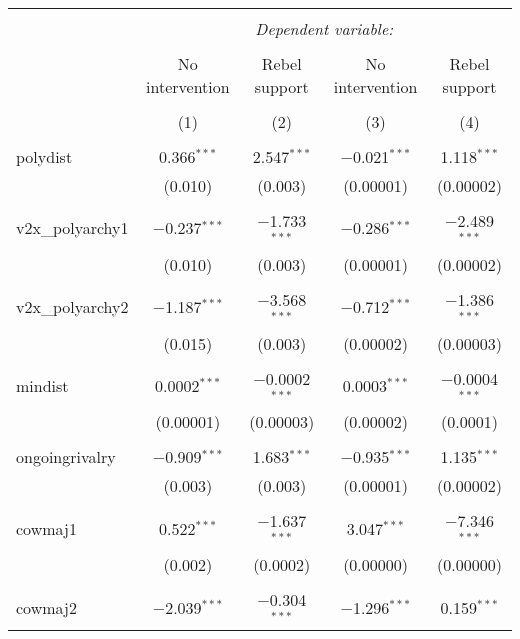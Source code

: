 
\begin{table}[!htbp] \centering 
  \caption{} 
  \label{} 
\begin{tabular}{@{\extracolsep{5pt}}lcccc} 
\\[-1.8ex]\hline 
\hline \\[-1.8ex] 
 & \multicolumn{4}{c}{\textit{Dependent variable:}} \\ 
\cline{2-5} 
\\[-1.8ex] & No intervention & Rebel support & No intervention & Rebel support \\ 
\\[-1.8ex] & (1) & (2) & (3) & (4)\\ 
\hline \\[-1.8ex] 
 polydist & 0.366$^{***}$ & 2.547$^{***}$ & $-$0.021$^{***}$ & 1.118$^{***}$ \\ 
  & (0.010) & (0.003) & (0.00001) & (0.00002) \\ 
  & & & & \\ 
 v2x\_polyarchy1 & $-$0.237$^{***}$ & $-$1.733$^{***}$ & $-$0.286$^{***}$ & $-$2.489$^{***}$ \\ 
  & (0.010) & (0.003) & (0.00001) & (0.00002) \\ 
  & & & & \\ 
 v2x\_polyarchy2 & $-$1.187$^{***}$ & $-$3.568$^{***}$ & $-$0.712$^{***}$ & $-$1.386$^{***}$ \\ 
  & (0.015) & (0.003) & (0.00002) & (0.00003) \\ 
  & & & & \\ 
 mindist & 0.0002$^{***}$ & $-$0.0002$^{***}$ & 0.0003$^{***}$ & $-$0.0004$^{***}$ \\ 
  & (0.00001) & (0.00003) & (0.00002) & (0.0001) \\ 
  & & & & \\ 
 ongoingrivalry & $-$0.909$^{***}$ & 1.683$^{***}$ & $-$0.935$^{***}$ & 1.135$^{***}$ \\ 
  & (0.003) & (0.003) & (0.00001) & (0.00002) \\ 
  & & & & \\ 
 cowmaj1 & 0.522$^{***}$ & $-$1.637$^{***}$ & 3.047$^{***}$ & $-$7.346$^{***}$ \\ 
  & (0.002) & (0.0002) & (0.00000) & (0.00000) \\ 
  & & & & \\ 
 cowmaj2 & $-$2.039$^{***}$ & $-$0.304$^{***}$ & $-$1.296$^{***}$ & 0.159$^{***}$ \\ 

\end{tabular}
\end{table}

